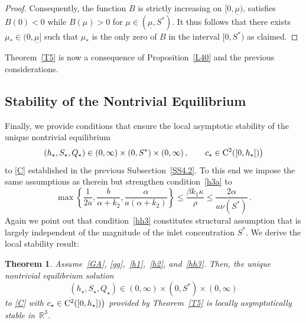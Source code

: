 \documentclass[reqno,11pt]{amsart}
\newtheorem{thm}{Theorem}[section]
\numberwithin{equation}{section}
\newcommand{\R}{\mathbb{R}}
\begin{document}
\begin{proof}
Consequently, the function $B$ is strictly increasing on $[0,\underline{\mu})$, satisfies $B(0)<0$ while $B(\mu)>0$ for $\mu \in (\underline{\mu},S^*)$. It thus follows that there exists $\mu_*\in (0,\underline{\mu}]$ such that $\mu_*$ is the only zero of $B$ in the interval $[0,S^*)$ as claimed.
\end{proof}

Theorem~\ref{T5} is now a consequence of Proposition~\ref{L40} and the previous considerations.



\subsection{Stability of the Nontrivial Equilibrium}



Finally, we provide conditions that ensure the local asymptotic stability of the unique nontrivial equilibrium
$$
(h_\star,S_\star,Q_\star)\in (0,\infty)\times (0,S^*)\times (0,\infty)\,,\qquad  c_\star\in {\rm C}^2([0,h_\star])\big)
$$ 
to \eqref{C} established in the previous Subsection~\ref{SS4.2}. To this end we impose the same assumptions as therein but strengthen condition~\eqref{h3a} to 
\begin{equation}\label{hh3}
\max\left\{\frac{1}{2a},\frac{b}{\alpha+k_2},\frac{\alpha}{a(\alpha+k_2)}\right\}\le \frac{\beta k_1\kappa}{\rho}\le \frac{2\alpha}{a\nu(S^*)}\,.
\end{equation}
Again we point out that condition~\eqref{hh3}  constitutes structural assumption that is largely independent of the magnitude of the inlet concentration $S^*$.
We derive the local stability result:

\begin{thm}\label{T6}
Assume~\eqref{GA}, \eqref{gg},~\eqref{h1},~\eqref{h2}, and~\eqref{hh3}.
Then, the unique nontrivial equilibrium solution 
$$
(h_\star,S_\star,Q_\star)\in (0,\infty)\times (0,S^*)\times (0,\infty)
$$ 
to \eqref{C} with $c_\star\in {\rm C}^2([0,h_\star])\big)$ provided by Theorem~\ref{T5} is locally asymptotically  stable in~$\R^3$.
\end{thm}
\end{document}
